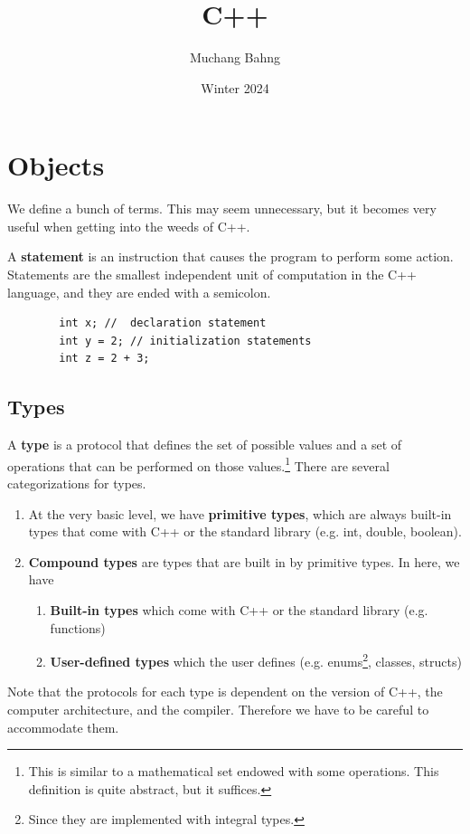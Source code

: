 \documentclass{article}
\newcounter{definition}[section]
\begin{document}
\title{C++}
\author{Muchang Bahng}
\date{Winter 2024}

\maketitle
\tableofcontents
\pagebreak

\section{Objects}

    We define a bunch of terms. This may seem unnecessary, but it becomes very useful when getting into the weeds of C++. 

    \begin{definition}[Statements]
      \label{def:statements}
      A \textbf{statement} is an instruction that causes the program to perform some action. Statements are the smallest independent unit of computation in the C++ language, and they are ended with a semicolon. 
      \begin{lstlisting}
        int x; //  declaration statement 
        int y = 2; // initialization statements  
        int z = 2 + 3;
      \end{lstlisting}
    \end{definition}

  \subsection{Types}

    \begin{definition}[Type]
      \label{def:type}
      A \textbf{type} is a protocol that defines the set of possible values and a set of operations that can be performed on those values.\footnote{This is similar to a mathematical set endowed with some operations. This definition is quite abstract, but it suffices.} There are several categorizations for types. 
      \begin{enumerate}
        \item At the very basic level, we have \textbf{primitive types}, which are always built-in types that come with C++ or the standard library (e.g. int, double, boolean). 
        \item \textbf{Compound types} are types that are built in by primitive types. In here, we have 
          \begin{enumerate}
            \item \textbf{Built-in types} which come with C++ or the standard library (e.g. functions) 
            \item \textbf{User-defined types} which the user defines (e.g. enums\footnote{Since they are implemented with integral types.}, classes, structs)
          \end{enumerate}
      \end{enumerate}
      Note that the protocols for each type is dependent on the version of C++, the computer architecture, and the compiler. Therefore we have to be careful to accommodate them. 
    \end{definition}
\end{document}
